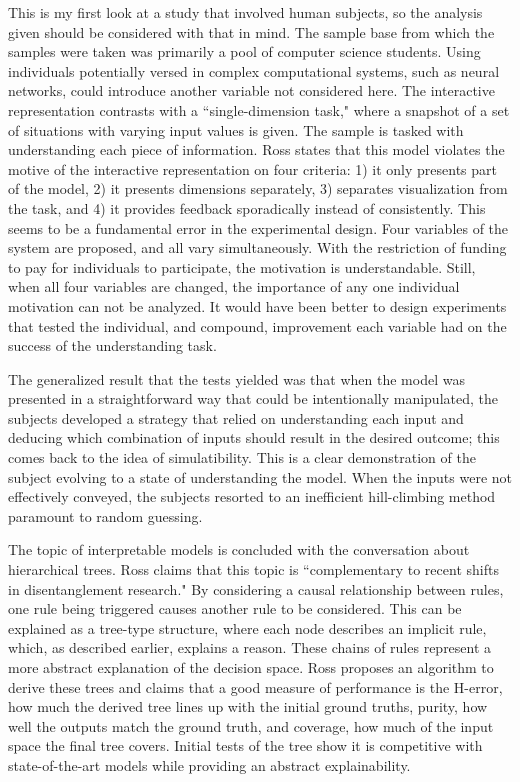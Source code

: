 \documentclass[twoside,11pt]{article}
\begin{document}
This is my first look at a study that involved human subjects, so the analysis given should be considered with that in mind. The sample base from which the samples were taken was primarily a pool of computer science students. Using individuals potentially versed in complex computational systems, such as neural networks, could introduce another variable not considered here. The interactive representation contrasts with a ``single-dimension task," where a snapshot of a set of situations with varying input values is given. The sample is tasked with understanding each piece of information. Ross states that this model violates the motive of the interactive representation on four criteria: 1) it only presents part of the model, 2) it presents dimensions separately, 3) separates visualization from the task, and 4) it provides feedback sporadically instead of consistently. This seems to be a fundamental error in the experimental design. Four variables of the system are proposed, and all vary simultaneously. With the restriction of funding to pay for individuals to participate, the motivation is understandable. Still, when all four variables are changed, the importance of any one individual motivation can not be analyzed. It would have been better to design experiments that tested the individual, and compound, improvement each variable had on the success of the understanding task. 

The generalized result that the tests yielded was that when the model was presented in a straightforward way that could be intentionally manipulated, the subjects developed a strategy that relied on understanding each input and deducing which combination of inputs should result in the desired outcome;  this comes back to the idea of simulatibility. This is a clear demonstration of the subject evolving to a state of understanding the model. When the inputs were not effectively conveyed, the subjects resorted to an inefficient hill-climbing method paramount to random guessing. 

The topic of interpretable models is concluded with the conversation about hierarchical trees. Ross claims that this topic is ``complementary to recent shifts in disentanglement research." By considering a causal relationship between rules, one rule being triggered causes another rule to be considered. This can be explained as a tree-type structure, where each node describes an implicit rule, which, as described earlier, explains a reason. These chains of rules represent a more abstract explanation of the decision space. Ross proposes an algorithm to derive these trees and claims that a good measure of performance is the H-error, how much the derived tree lines up with the initial ground truths, purity, how well the outputs match the ground truth, and coverage, how much of the input space the final tree covers. Initial tests of the tree show it is competitive with state-of-the-art models while providing an abstract explainability. 
\end{document}
